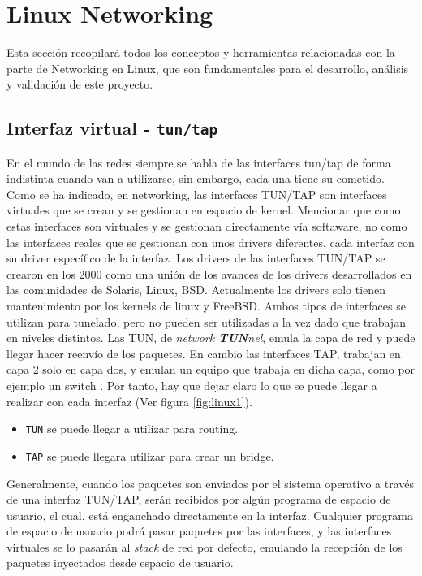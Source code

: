 \section{Linux Networking}
\label{sec:linuxNetworking}

Esta sección recopilará todos los conceptos y herramientas relacionadas con la parte de Networking en Linux, que son fundamentales para el desarrollo, análisis y validación de este proyecto.



\subsection{Interfaz virtual - \texttt{tun/tap}}
\label{linuxNetworking_tuntap}

En el mundo de las redes siempre se habla de las interfaces tun/tap de forma indistinta cuando van a utilizarse, sin embargo, cada una tiene su cometido. Como se ha indicado, en networking, las interfaces TUN/TAP son interfaces virtuales que se crean y se gestionan en espacio de kernel. Mencionar que como estas interfaces son virtuales y se gestionan directamente vía softaware, no como las interfaces reales que se gestionan con unos drivers diferentes, cada interfaz con su driver específico de la interfaz.  Los drivers de las interfaces TUN/TAP se crearon en los 2000 como una unión de los avances de los drivers desarrollados en las comunidades de Solaris, Linux, BSD. Actualmente los drivers solo tienen mantenimiento por los kernels de linux y FreeBSD. Ambos tipos de interfaces se utilizan para tunelado, pero no pueden ser utilizadas a la vez dado que trabajan en niveles distintos. Las TUN, de \textit{network \textbf{TUN}nel}, emula la capa de red y puede llegar hacer reenvío de los paquetes. En cambio las interfaces TAP,  trabajan en capa 2 solo en capa dos, y emulan un equipo que trabaja en dicha capa, como por ejemplo un switch \cite{tuntap1}. Por tanto, hay que dejar claro lo que se puede llegar a realizar con cada interfaz (Ver figura \ref{fig:linux1}).

\begin{itemize}
    \item \texttt{TUN} se puede llegar a utilizar para routing.
    \item \texttt{TAP} se puede llegara utilizar para crear un bridge.
\end{itemize}

Generalmente, cuando los paquetes son enviados por el sistema operativo a través de una interfaz TUN/TAP,  serán recibidos por algún programa de espacio de usuario, el cual, está enganchado directamente en la interfaz. Cualquier programa de espacio de usuario podrá pasar paquetes por las interfaces, y las interfaces virtuales se lo pasarán al \textit{stack} de red por defecto, emulando la recepción de los paquetes inyectados desde espacio de usuario.

